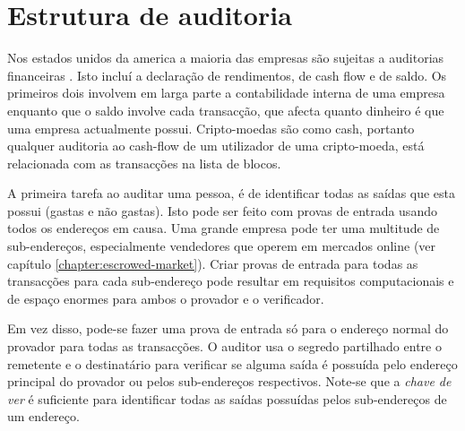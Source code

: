 \section{Estrutura de auditoria}
\label{sec:proofs-monero-audit-framework}

Nos estados unidos da america a maioria das empresas são sujeitas a auditorias financeiras \cite{investopedia-audits}. Isto incluí a declaração de rendimentos, de cash flow e de saldo. Os primeiros dois involvem em larga parte a contabilidade interna de uma empresa enquanto que o saldo involve cada transacção, que afecta quanto dinheiro é que uma empresa actualmente possui. Cripto-moedas são como cash, portanto qualquer auditoria ao cash-flow de um utilizador de uma cripto-moeda, está relacionada com as transacções na lista de blocos.       

A primeira tarefa ao auditar uma pessoa, é de identificar todas as saídas que esta possui (gastas e não gastas). Isto pode ser feito com provas de entrada usando todos os endereços em causa. Uma grande empresa pode ter uma multitude de sub-endereços, especialmente vendedores que operem em mercados online (ver capítulo 
\ref{chapter:escrowed-market}). Criar provas de entrada para todas as transacções para cada sub-endereço pode resultar em requisitos computacionais e de espaço enormes para ambos o provador e o verificador.


Em vez disso, pode-se fazer uma prova de entrada só para o endereço normal do provador para todas as transacções. O auditor usa o segredo partilhado entre o remetente e o destinatário para verificar se alguma saída é possuída pelo endereço principal do provador ou pelos sub-endereços respectivos. Note-se que a {\em chave de ver} é suficiente para identificar todas as saídas possuídas pelos sub-endereços de um endereço.


